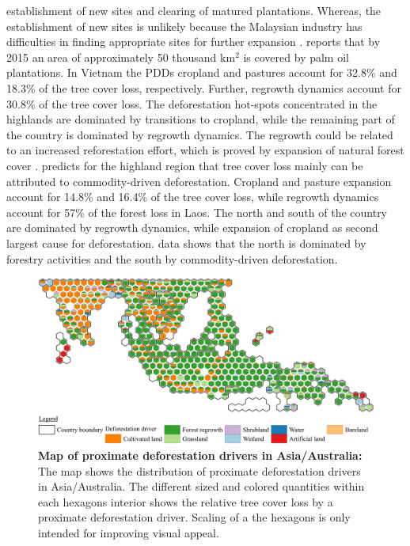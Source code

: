 establishment of new sites and clearing of matured plantations. Whereas, the establishment of new sites is unlikely because the Malaysian industry has difficulties in finding appropriate sites for further expansion \citep{Corley2016}. \citeauthor{Corley2016} reports that by 2015 an area of approximately 50 thousand km$^2$ is covered by palm oil plantations. In Vietnam the \acp{PDD} cropland and pastures account for 32.8\% and 18.3\% of the tree cover loss, respectively. Further, regrowth dynamics account for 30.8\% of the tree cover loss. The deforestation hot-spots concentrated in the highlands are dominated by transitions to cropland, while the remaining part of the country is dominated by regrowth dynamics. The regrowth could be related to an increased reforestation effort, which is proved by expansion of natural forest cover \citep{Chazdon2008}. \citet{Curtis2018} predicts for the highland region that tree cover loss mainly can be attributed to commodity-driven deforestation. Cropland and pasture expansion account for 14.8\% and 16.4\% of the tree cover loss, while regrowth dynamics account for 57\% of the forest loss in Laos. The north and south of the country are dominated by regrowth dynamics, while expansion of cropland as second largest cause for deforestation. \citet{Curtis2018} data shows that the north is dominated by forestry activities and the south by commodity-driven deforestation.
			\begin{figure}[ht]
				\centering
				\includegraphics[scale=1]{img/asia_driver_frameless}
				\caption[Map of proximate deforestation drivers in Asia/Australia]{\textbf{Map of proximate deforestation drivers in Asia/Australia:} The map shows the distribution of proximate deforestation drivers in Asia/Australia. The different sized and colored quantities within each hexagons interior shows the relative tree cover loss by a proximate deforestation driver. Scaling of a the hexagons is only intended for improving visual appeal.}
				\label{fig:asia_driver}
			\end{figure}


